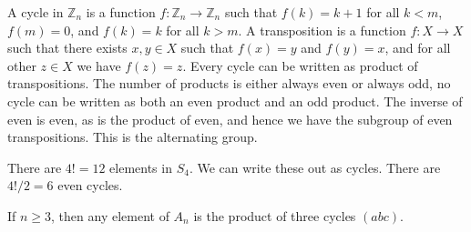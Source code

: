             A cycle in $\mathbb{Z}_{n}$ is a function
            $f:\mathbb{Z}_{n}\rightarrow\mathbb{Z}_{n}$ such that
            $f(k)=k+1$ for all $k<m$, $f(m)=0$, and $f(k)=k$ for all $k>m$.
            A transposition is a function $f:X\rightarrow{X}$ such that
            there exists $x,y\in{X}$ such that $f(x)=y$ and $f(y)=x$, and
            for all other $z\in{X}$ we have $f(z)=z$. Every cycle can be
            written as product of transpositions. The number of products is
            either always even or always odd, no cycle can be written as
            both an even product and an odd product. The inverse of even is
            even, as is the product of even, and hence we have the subgroup
            of even transpositions. This is the alternating group.
            \begin{example}
                There are $4!=12$ elements in $S_{4}$. We can write these
                out as cycles. There are $4!/2=6$ even cycles.
            \end{example}
            \begin{theorem}
                If $n\geq{3}$, then any element of $A_{n}$ is the product of
                three cycles $(abc)$.
            \end{theorem}
